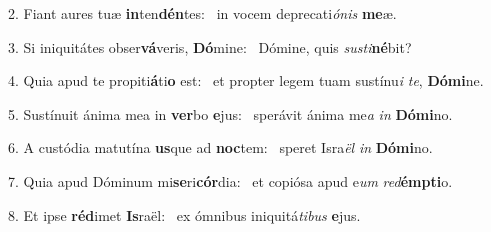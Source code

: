 2. Fiant aures tuæ \textbf{in}ten\textbf{dén}tes: \ast\  in vocem deprecati\textit{ó}\textit{nis} \textbf{me}æ.\

3. Si iniquitátes obser\textbf{vá}veris, \textbf{Dó}mine: \ast\  Dómine, quis \textit{sus}\textit{ti}\textbf{né}bit?\

4. Quia apud te propiti\textbf{á}ti\textbf{o} est: \ast\  et propter legem tuam sustínu\textit{i} \textit{te}, \textbf{Dó}\textbf{mi}ne.\

5. Sustínuit ánima mea in \textbf{ver}bo \textbf{e}jus: \ast\  sperávit ánima me\textit{a} \textit{in} \textbf{Dó}\textbf{mi}no.\

6. A custódia matutína \textbf{us}que ad \textbf{noc}tem: \ast\  speret Isra\textit{ël} \textit{in} \textbf{Dó}\textbf{mi}no.\

7. Quia apud Dóminum mi\textbf{se}ri\textbf{cór}dia: \ast\  et copiósa apud e\textit{um} \textit{red}\textbf{émp}\textbf{ti}o.\

8. Et ipse \textbf{réd}imet \textbf{Is}raël: \ast\  ex ómnibus iniquitá\textit{ti}\textit{bus} \textbf{e}jus.\

